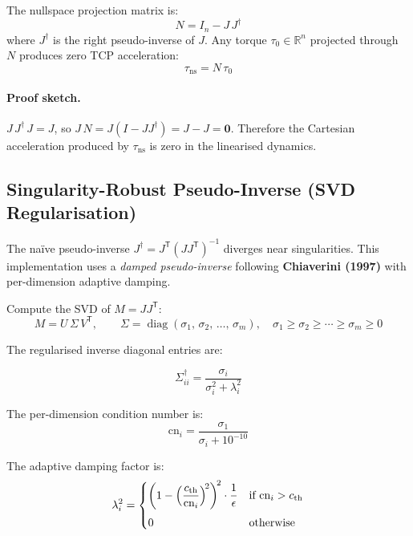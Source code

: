\documentclass[11pt,a4paper]{article}
\newcommand{\R}{\mathbb{R}}
\newcommand{\tr}{\mathsf{T}}
\newcommand{\diag}{\operatorname{diag}}
\begin{document}
The nullspace projection matrix is:
\begin{equation}
  N = I_n - J\,J^\dagger
  \label{eq:nullspace_proj}
\end{equation}
where $J^\dagger$ is the right pseudo-inverse of $J$.  Any torque
$\tau_0 \in \R^n$ projected through $N$ produces zero TCP acceleration:
\[
  \tau_{\text{ns}} = N\,\tau_0
\]

\paragraph{Proof sketch.}
$J\,J^\dagger\,J = J$, so $J\,N = J(I - JJ^\dagger) = J - J = \bm{0}$.
Therefore the Cartesian acceleration produced by $\tau_{\text{ns}}$ is zero in
the linearised dynamics.

\subsection{Singularity-Robust Pseudo-Inverse (SVD Regularisation)}
\label{sec:svd}

The na\"ive pseudo-inverse $J^\dagger = J^\tr(JJ^\tr)^{-1}$ diverges near
singularities.  This implementation uses a \emph{damped pseudo-inverse}
following \textbf{Chiaverini (1997)} with per-dimension adaptive damping.

\medskip

Compute the SVD of $M = JJ^\tr$:
\[
  M = U\,\Sigma\,V^\tr,
  \qquad
  \Sigma = \diag(\sigma_1,\, \sigma_2,\, \ldots,\, \sigma_m),
  \quad
  \sigma_1 \ge \sigma_2 \ge \cdots \ge \sigma_m \ge 0
\]

The regularised inverse diagonal entries are:

\begin{keqbox}
\begin{equation}
  \Sigma^\dagger_{ii}
  = \frac{\sigma_i}{\sigma_i^2 + \lambda_i^2}
  \label{eq:reg_sv}
\end{equation}
\end{keqbox}

The per-dimension condition number is:
\[
  \text{cn}_i = \frac{\sigma_1}{\sigma_i + 10^{-10}}
\]

The adaptive damping factor is:
\begin{equation}
  \lambda_i^2 =
  \begin{cases}
    \displaystyle
    \left(1 - \Bigl(\frac{c_{\text{th}}}{\text{cn}_i}\Bigr)^{\!2}\right)^{\!2}
    \cdot \frac{1}{\epsilon}
    & \text{if } \text{cn}_i > c_{\text{th}} \\[10pt]
    0 & \text{otherwise}
  \end{cases}
  \label{eq:lambda}
\end{equation}
\end{document}
